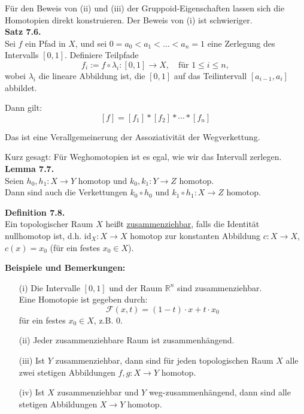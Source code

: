 \documentclass[fleqn, 12pt, letterpaper]{article}
\begin{document}
\vspace{1em}
Für den Beweis von (ii) und (iii) der Gruppoid-Eigenschaften lassen sich die Homotopien direkt konstruieren. {Der Beweis von (i) ist schwieriger.}\\

\textbf{Satz 7.6.} \\
Sei \( f \) ein Pfad in \( X \), und sei \( 0 = a_0 < a_1 < \dots < a_n = 1 \) eine Zerlegung des Intervalls \([0,1]\). Definiere Teilpfade
\[
f_i := f \circ \lambda_i : [0,1] \to X, \quad \text{für } 1 \leq i \leq n,
\]
wobei \( \lambda_i \) die lineare Abbildung ist, die \([0,1]\) auf das Teilintervall \([a_{i-1}, a_i] \) abbildet.

Dann gilt:
\[
[f] = [f_1] * [f_2] * \cdots * [f_n]
\]

Das ist eine {Verallgemeinerung der Assoziativität} der Wegverkettung.

Kurz gesagt: Für Weghomotopien ist es egal, wie wir das Intervall zerlegen.\\

\textbf{Lemma 7.7.} \\
Seien \( h_0, h_1 : X \to Y \) homotop und \( k_0, k_1 : Y \to Z \) homotop. \\
Dann sind auch die Verkettungen \( k_0 \circ h_0 \) und \( k_1 \circ h_1 : X \to Z \) homotop.

\vspace{1em}

\textbf{Definition 7.8.} \\
Ein topologischer Raum \( X \) heißt \underline{zusammenziehbar}, falls die Identität nullhomotop ist, d.h. \( \text{id}_X : X \to X \) homotop zur konstanten Abbildung \( c : X \to X \), \( c(x) = x_0 \) (für ein festes \( x_0 \in X \)).

\vspace{1em}

\textbf{Beispiele und Bemerkungen:}
\begin{enumerate}
  \item[(i)] Die Intervalle \( [0,1] \) und der Raum \( \mathbb{R}^n \) sind zusammenziehbar. \\
  Eine Homotopie ist gegeben durch:
  \[
  \mathcal{F}(x,t) = (1 - t) \cdot x + t \cdot x_0
  \]
  für ein festes \( x_0 \in X \), z.B. \( 0 \).

  \item[(ii)] Jeder zusammenziehbare Raum ist zusammenhängend.

  \item[(iii)] Ist \( Y \) zusammenziehbar, dann sind für jeden topologischen Raum \( X \) alle zwei stetigen Abbildungen \( f, g : X \to Y \) homotop.

  \item[(iv)] Ist \( X \) zusammenziehbar und \( Y \) weg-zusammenhängend, dann sind alle stetigen Abbildungen \( X \to Y \) homotop.
\end{enumerate}
\end{document}
